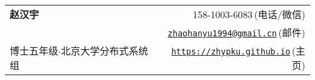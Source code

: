 
\newcommand{\paint}[3]{
    \begin{minipage}{#1}
        \texttt{[image: \#3]}
    \end{minipage} 
}

\newcommand{\myheader}{
    \begin{tabular*}{\textwidth}{l@{\extracolsep{\fill}}r}
        \specialrule{0em}{4pt}{4pt}
        \textbf{{\LARGE 赵汉宇}} & 158-1003-6083$\,${\color{labelgrey}(电话/微信)}\\
        & \href{mailto:zhaohanyu@pku.edu.cn}{\texttt{zhaohanyu1994@gmail.cn}}$\,${\color{labelgrey}(邮件)} \\
        {\large 博士五年级$\cdot$北京大学分布式系统组} & \href{https://zhypku.github.io}{\texttt{https://zhypku.github.io}}$\,${\color{labelgrey}(主页)} \\
    \end{tabular*}\\\vspace{0.1in}
}

\myheader

